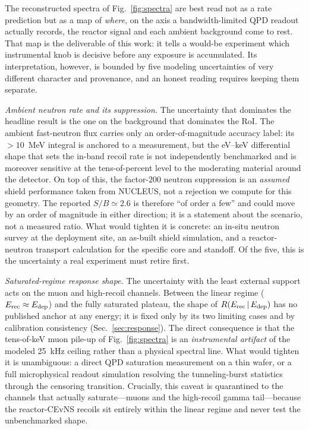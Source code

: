 The reconstructed spectra of Fig.~\ref{fig:spectra} are best read not as a
rate prediction but as a map of \emph{where}, on the axis a
bandwidth-limited QPD readout actually records, the reactor signal and each
ambient background come to rest. That map is the deliverable of this work:
it tells a would-be experiment which instrumental knob is decisive before
any exposure is accumulated. Its interpretation, however, is bounded by five
modeling uncertainties of very different character and provenance, and an
honest reading requires keeping them separate.

\emph{Ambient neutron rate and its suppression.} The uncertainty that
dominates the headline result is the one on the background that dominates the
RoI. The ambient fast-neutron flux carries only an order-of-magnitude
accuracy label: its $>10$~MeV integral is anchored to a measurement, but the
eV--keV differential shape that sets the in-band recoil rate is not
independently benchmarked and is moreover sensitive at the tens-of-percent
level to the moderating material around the detector. On top of this, the
factor-$200$ neutron suppression is an \emph{assumed} shield performance
taken from NUCLEUS, not a rejection we compute for this geometry. The
reported $S/B\simeq2.6$ is therefore ``of order a few'' and could move by an
order of magnitude in either direction; it is a statement about the
scenario, not a measured ratio. What would tighten it is
concrete: an in-situ neutron survey at the deployment site, an as-built
shield simulation, and a reactor-neutron transport calculation for the
specific core and standoff. Of the five, this is the uncertainty a real
experiment must retire first.

\emph{Saturated-regime response shape.} The uncertainty with the least
external support acts on the muon and high-recoil channels. Between the
linear regime ($E_{\rm rec}\approx E_{\rm dep}$) and the fully saturated
plateau, the
shape of $R(E_{\rm rec}\,|\,E_{\rm dep})$ has no published anchor at any
energy; it is fixed only by its two limiting cases and by calibration
consistency (Sec.~\ref{sec:response}). The direct consequence is that the
tens-of-keV muon pile-up of Fig.~\ref{fig:spectra} is an \emph{instrumental
artifact} of the modeled 25~kHz ceiling rather than a physical spectral
line. What would tighten it is unambiguous: a direct QPD saturation
measurement on a thin wafer, or a full microphysical readout simulation
resolving the tunneling-burst statistics through the censoring transition.
Crucially, this caveat is quarantined to the channels that actually
saturate---muons and the high-recoil gamma tail---because the reactor-CEvNS
recoils sit entirely within the linear regime and never test the
unbenchmarked shape.

